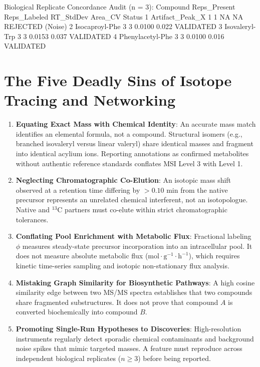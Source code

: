 \documentclass[11pt,twoside,openright]{book}
\begin{document}
\begin{routput}
Biological Replicate Concordance Audit (n = 3):
          Compound Reps\_Present Reps\_Labeled RT\_StdDev Area\_CV           Status
1  Artifact\_Peak\_X            1            1        NA      NA REJECTED (Noise)
2   Isocaproyl-Phe            3            3    0.0100   0.022        VALIDATED
3   Isovaleryl-Trp            3            3    0.0153   0.037        VALIDATED
4 Phenylacetyl-Phe            3            3    0.0100   0.016        VALIDATED
\end{routput}

\section{The Five Deadly Sins of Isotope Tracing and Networking}

\begin{enumerate}
    \item \textbf{Equating Exact Mass with Chemical Identity}: An accurate mass match identifies an elemental formula, not a compound. Structural isomers (e.g., branched isovaleryl versus linear valeryl) share identical masses and fragment into identical acylium ions. Reporting annotations as confirmed metabolites without authentic reference standards conflates MSI Level 3 with Level 1.
    \item \textbf{Neglecting Chromatographic Co-Elution}: An isotopic mass shift observed at a retention time differing by $>0.10$ min from the native precursor represents an unrelated chemical interferent, not an isotopologue. Native and $^{13}\text{C}$ partners must co-elute within strict chromatographic tolerances.
    \item \textbf{Conflating Pool Enrichment with Metabolic Flux}: Fractional labeling $\phi$ measures steady-state precursor incorporation into an intracellular pool. It does not measure absolute metabolic flux ($\text{mol} \cdot \text{g}^{-1} \cdot \text{h}^{-1}$), which requires kinetic time-series sampling and isotopic non-stationary flux analysis.
    \item \textbf{Mistaking Graph Similarity for Biosynthetic Pathways}: A high cosine similarity edge between two MS/MS spectra establishes that two compounds share fragmented substructures. It does not prove that compound $A$ is converted biochemically into compound $B$.
    \item \textbf{Promoting Single-Run Hypotheses to Discoveries}: High-resolution instruments regularly detect sporadic chemical contaminants and background noise spikes that mimic targeted masses. A feature must reproduce across independent biological replicates ($n \ge 3$) before being reported.
\end{enumerate}
\end{document}
